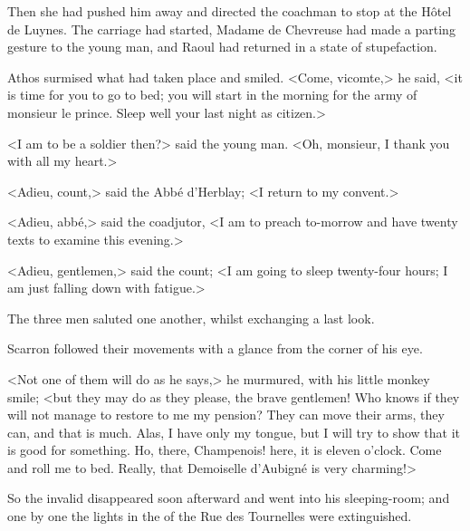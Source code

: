 Then she had pushed him away and directed the coachman to stop at the Hôtel de Luynes. The carriage had started, Madame de Chevreuse had made a parting gesture to the young man, and Raoul had returned in a state of stupefaction.

Athos surmised what had taken place and smiled. <Come, vicomte,> he said, <it is time for you to go to bed; you will start in the morning for the army of monsieur le prince. Sleep well your last night as citizen.>

<I am to be a soldier then?> said the young man. <Oh, monsieur, I thank you with all my heart.>

<Adieu, count,> said the Abbé d'Herblay; <I return to my convent.>

<Adieu, abbé,> said the coadjutor, <I am to preach to-morrow and have twenty texts to examine this evening.>

<Adieu, gentlemen,> said the count; <I am going to sleep twenty-four hours; I am just falling down with fatigue.>

The three men saluted one another, whilst exchanging a last look.

Scarron followed their movements with a glance from the corner of his eye.

<Not one of them will do as he says,> he murmured, with his little monkey smile; <but they may do as they please, the brave gentlemen! Who knows if they will not manage to restore to me my pension? They can move their arms, they can, and that is much. Alas, I have only my tongue, but I will try to show that it is good for something. Ho, there, Champenois! here, it is eleven o'clock. Come and roll me to bed. Really, that Demoiselle d'Aubigné is very charming!>

So the invalid disappeared soon afterward and went into his sleeping-room; and one by one the lights in the  of the Rue des Tournelles were extinguished. 